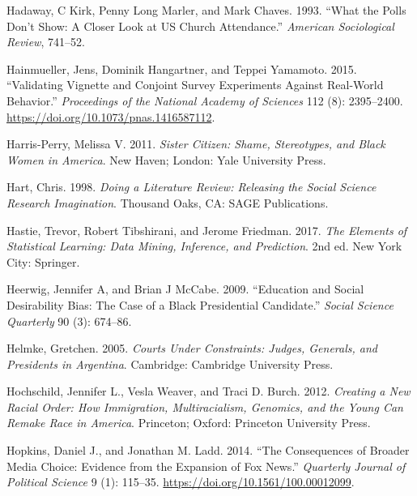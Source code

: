 \documentclass{book}
\newlength{\cslhangindent}
\newlength{\cslentryspacingunit} %
\newenvironment{CSLReferences}[2] %
 {%
  \setlength{\parindent}{0pt}
  \ifodd #1
  \let\oldpar\par
  \def\par{\hangindent=\cslhangindent\oldpar}
  \fi
  \setlength{\parskip}{#2\cslentryspacingunit}
 }%
 {}
\begin{document}
\begin{CSLReferences}{1}{0}
\leavevmode{}%
Hadaway, C Kirk, Penny Long Marler, and Mark Chaves. 1993. {``What the Polls
Don't Show: A Closer Look at US Church Attendance.''} \emph{American
Sociological Review}, 741--52.

\leavevmode{}%
Hainmueller, Jens, Dominik Hangartner, and Teppei Yamamoto. 2015.
{``Validating Vignette and Conjoint Survey Experiments Against Real-World
Behavior.''} \emph{Proceedings of the National Academy of Sciences} 112 (8):
2395--2400. \url{https://doi.org/10.1073/pnas.1416587112}.

\leavevmode{}%
Harris-Perry, Melissa V. 2011. \emph{Sister Citizen: Shame, Stereotypes, and
Black Women in America}. New Haven; London: Yale University Press.

\leavevmode{}%
Hart, Chris. 1998. \emph{Doing a {Literature Review}: {Releasing} the {Social
Science Research Imagination}}. Thousand Oaks, CA: {SAGE Publications}.

\leavevmode{}%
Hastie, Trevor, Robert Tibshirani, and Jerome Friedman. 2017. \emph{\emph{The
Elements of Statistical Learning: Data Mining, Inference, and Prediction}}.
2nd ed. New York City: Springer.

\leavevmode{}%
Heerwig, Jennifer A, and Brian J McCabe. 2009. {``Education and Social
Desirability Bias: The Case of a Black Presidential Candidate.''} \emph{Social
Science Quarterly} 90 (3): 674--86.

\leavevmode{}%
Helmke, Gretchen. 2005. \emph{Courts {Under Constraints}: {Judges},
{Generals}, and {Presidents} in {Argentina}}. {Cambridge}: {Cambridge
University Press}.

\leavevmode{}%
Hochschild, Jennifer L., Vesla Weaver, and Traci D. Burch. 2012.
\emph{Creating a New Racial Order: How Immigration, Multiracialism, Genomics,
and the Young Can Remake Race in America}. Princeton; Oxford: Princeton
University Press.

\leavevmode{}%
Hopkins, Daniel J., and Jonathan M. Ladd. 2014. {``The {Consequences} of
{Broader Media Choice}: {Evidence} from the {Expansion} of {Fox News}.''}
\emph{Quarterly Journal of Political Science} 9 (1): 115--35.
\url{https://doi.org/10.1561/100.00012099}.


\end{CSLReferences}
\end{document}
